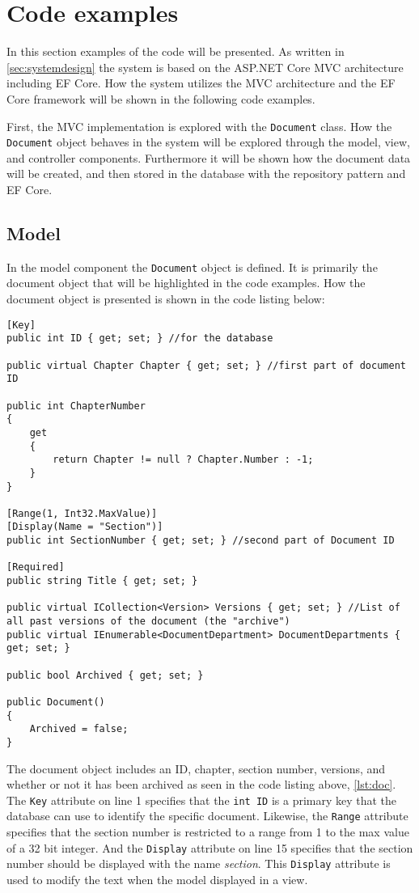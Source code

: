 \section{Code examples}\label{sec:codeexamples}
In this section examples of the code will be presented.
As written in \cref{sec:systemdesign} the system is based on the ASP.NET Core MVC architecture including EF Core.
How the system utilizes the MVC architecture and the EF Core framework will be shown in the following code examples.

First, the MVC implementation is explored with the \texttt{Document} class.
How the \texttt{Document} object behaves in the system will be explored through the model, view, and controller components.
Furthermore it will be shown how the document data will be created, and then stored in the database with the repository pattern and EF Core.

\subsection{Model}

In the model component the \texttt{Document} object is defined.
It is primarily the document object that will be highlighted in the code examples.
How the document object is presented is shown in the code listing below:

\newpage
\begin{lstlisting}[caption={Document Model: Document object}, label={lst:doc}]
[Key]
public int ID { get; set; } //for the database

public virtual Chapter Chapter { get; set; } //first part of document ID

public int ChapterNumber
{
	get
	{
		return Chapter != null ? Chapter.Number : -1;
	}
}

[Range(1, Int32.MaxValue)]
[Display(Name = "Section")]
public int SectionNumber { get; set; } //second part of Document ID

[Required]
public string Title { get; set; }

public virtual ICollection<Version> Versions { get; set; } //List of all past versions of the document (the "archive")
public virtual IEnumerable<DocumentDepartment> DocumentDepartments { get; set; }

public bool Archived { get; set; }

public Document()
{
	Archived = false;
}
\end{lstlisting}

The document object includes an ID, chapter, section number, versions, and whether or not it has been archived as seen in the code listing above, \cref{lst:doc}.
The \texttt{Key} attribute on line 1 specifies that the \texttt{int ID} is a primary key that the database can use to identify the specific document.
Likewise, the \texttt{Range} attribute specifies that the section number is restricted to a range from 1 to the max value of a 32 bit integer.
And the \texttt{Display} attribute on line 15 specifies that the section number should be displayed with the name \textit{section}.
This \texttt{Display} attribute is used to modify the text when the model displayed in a view.

